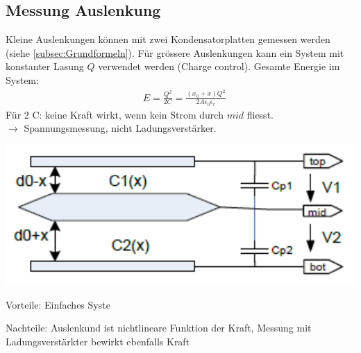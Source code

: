 \subsection{Messung Auslenkung}
\begin{minipage}{0.6\textwidth}
  Kleine Auslenkungen können mit zwei Kondensatorplatten gemessen werden (siehe \ref{subsec:Grundformeln}). Für grössere Auslenkungen kann ein System mit konstanter Lasung $Q$ verwendet werden (Charge control). Gesamte Energie im System: \\
    \begin{equation*} 
        \begin{split} 
           &E=\frac{Q^2}{2C}=\frac{(x_0 + x)Q^2}{2A\epsilon_0 \epsilon_r}
        \end{split} 
    \end{equation*}
  Für 2 C: keine Kraft wirkt, wenn kein Strom durch $mid$ fliesst.\\ $\rightarrow$ Spannungsmessung, nicht Ladungsverstärker.
\end{minipage}
\begin{minipage}{0.3\textwidth}
    \vspace{0pt}
    \includegraphics[width=1.2\textwidth]{images/Bewegung_C}
\end{minipage}
\begin{compactitem}
    \item Vorteile: Einfaches Syste
\end{compactitem}
\begin{compactitem}
    \item Nachteile: Auslenkund ist nichtlineare Funktion der Kraft, Messung mit Ladungsverstärkter bewirkt ebenfalls Kraft
\end{compactitem}



